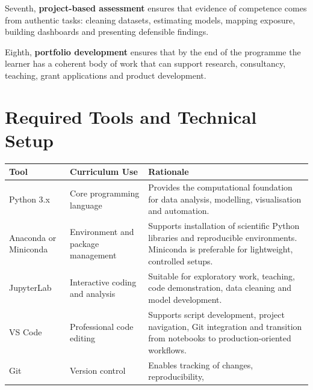 \documentclass[
  a4paper,
]{article}
\newcounter{none} %
\begin{document}
Seventh, \textbf{project-based assessment} ensures that evidence of
competence comes from authentic tasks: cleaning datasets, estimating
models, mapping exposure, building dashboards and presenting defensible
findings.

Eighth, \textbf{portfolio development} ensures that by the end of the
programme the learner has a coherent body of work that can support
research, consultancy, teaching, grant applications and product
development.

\section{Required Tools and Technical
Setup}\label{required-tools-and-technical-setup}

{\def\LTcaptype{none} %
\begin{longtable}[]{@{}
  >{\raggedright\arraybackslash}p{}
  >{\raggedright\arraybackslash}p{}
  >{\raggedright\arraybackslash}p{}@{}}
\toprule\noalign{}
\begin{minipage}[b]{\linewidth}\raggedright
Tool
\end{minipage} & \begin{minipage}[b]{\linewidth}\raggedright
Curriculum Use
\end{minipage} & \begin{minipage}[b]{\linewidth}\raggedright
Rationale
\end{minipage} \\
\midrule\noalign{}
\endhead
\bottomrule\noalign{}
\endlastfoot
Python 3.x & Core programming language & Provides the computational
foundation for data analysis, modelling, visualisation and
automation. \\
Anaconda or Miniconda & Environment and package management & Supports
installation of scientific Python libraries and reproducible
environments. Miniconda is preferable for lightweight, controlled
setups. \\
JupyterLab & Interactive coding and analysis & Suitable for exploratory
work, teaching, code demonstration, data cleaning and model
development. \\
VS Code & Professional code editing & Supports script development,
project navigation, Git integration and transition from notebooks to
production-oriented workflows. \\
Git & Version control & Enables tracking of changes, reproducibility,

\end{longtable}}
\end{document}
